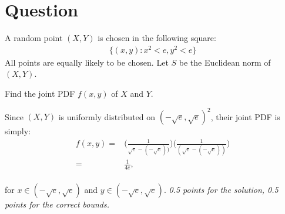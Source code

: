 \section{Question}

A random point $(X,Y)$ is chosen in the following square:
\begin{align*}
    \{(x, y) : x^2 < e,  y^2 < e \}
\end{align*}
All points are equally likely to be chosen. Let $S$ be the Euclidean norm of $(X,Y)$.
\begin{exercise}[1]
Find the joint PDF $f(x,y)$ of $X$ and $Y$.
\begin{solution}
Since $(X,Y)$ is uniformly distributed on $(-\sqrt{e}, \sqrt{e})^2$, their joint PDF is simply:
\begin{align*}
    f(x,y) =& \Big(\frac{1}{\sqrt{e} - (-\sqrt{e}))} \Big) \Big(\frac{1}{(\sqrt{e} - (-\sqrt{e}))} \Big) \\
    =& \frac{1}{4e},
\end{align*}\\
for $x\in (-\sqrt{e}, \sqrt{e})$ and $y\in (-\sqrt{e}, \sqrt{e})$.
\textit{0.5 points for the solution, 0.5 points for the correct bounds.}
\end{solution}
\end{exercise}


